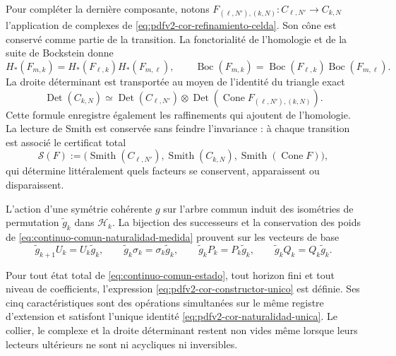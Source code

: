 Pour compléter la dernière composante, notons \(F_{(\ell,N'),(k,N)}:C_{\ell,N'}\to C_{k,N}\) l'application de complexes de \eqref{eq:pdfv2-cor-refinamiento-celda}. Son cône est conservé comme partie de la transition. La fonctorialité de l'homologie et de la suite de Bockstein donne
\begin{equation}
\label{eq:pdfv2-cor-naturalidad-homologia-bockstein}
 H_*(F_{m,k})=H_*(F_{\ell,k})H_*(F_{m,\ell}),
 \qquad
 \operatorname{Boc}(F_{m,k})
 =\operatorname{Boc}(F_{\ell,k})
  \operatorname{Boc}(F_{m,\ell}).
\end{equation}
La droite déterminant est transportée au moyen de l'identité du triangle exact
\begin{equation}
\label{eq:pdfv2-cor-naturalidad-determinante}
 \operatorname{Det}(C_{k,N})
 \simeq
 \operatorname{Det}(C_{\ell,N'})\otimes
 \operatorname{Det}\!\left(\operatorname{Cone}
 F_{(\ell,N'),(k,N)}\right).
\end{equation}
Cette formule enregistre également les raffinements qui ajoutent de l'homologie. La lecture de Smith est conservée sans feindre l'invariance : à chaque transition est associé le certificat total
\begin{equation}
\label{eq:pdfv2-cor-transicion-smith}
 \mathcal S(F):=
 \bigl(\operatorname{Smith}(C_{\ell,N'}),
       \operatorname{Smith}(C_{k,N}),
       \operatorname{Smith}(\operatorname{Cone}F)\bigr),
\end{equation}
qui détermine littéralement quels facteurs se conservent, apparaissent ou disparaissent.

L'action d'une symétrie cohérente \(g\) sur l'arbre commun induit des isométries de permutation \(\widetilde g_k\) dans \(\mathscr H_k\). La bijection des successeurs et la conservation des poids de \eqref{eq:continuo-comun-naturalidad-medida} prouvent sur les vecteurs de base
\begin{equation}
\label{eq:pdfv2-cor-naturalidad-transporte-hojas}
 \widetilde g_{k+1}U_k=U_k\widetilde g_k,
 \qquad
 \widetilde g_k\sigma_k=\sigma_k\widetilde g_k,
 \qquad
 \widetilde g_kP_k=P_k\widetilde g_k,
 \qquad
 \widetilde g_kQ_k=Q_k\widetilde g_k.
\end{equation}

\begin{theorem}
\label{thm:pdfv2-cor-totalidad-naturalidad}
Pour tout état total de \eqref{eq:continuo-comun-estado}, tout horizon fini et tout niveau de coefficients, l'expression \eqref{eq:pdfv2-cor-constructor-unico} est définie. Ses cinq caractéristiques sont des opérations simultanées sur le même registre d'extension et satisfont l'unique identité \eqref{eq:pdfv2-cor-naturalidad-unica}. Le collier, le complexe et la droite déterminant restent non vides même lorsque leurs lecteurs ultérieurs ne sont ni acycliques ni inversibles.
\end{theorem}

